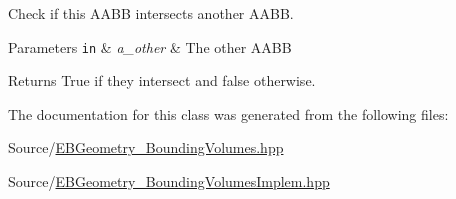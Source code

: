 Check if this A\+A\+BB intersects another A\+A\+BB. 


\begin{DoxyParams}[1]{Parameters}
\mbox{\tt in}  & {\em a\+\_\+other} & The other A\+A\+BB \\
\hline
\end{DoxyParams}
\begin{DoxyReturn}{Returns}
True if they intersect and false otherwise. 
\end{DoxyReturn}


The documentation for this class was generated from the following files\+:\begin{DoxyCompactItemize}
\item 
Source/\hyperlink{EBGeometry__BoundingVolumes_8hpp}{E\+B\+Geometry\+\_\+\+Bounding\+Volumes.\+hpp}\item 
Source/\hyperlink{EBGeometry__BoundingVolumesImplem_8hpp}{E\+B\+Geometry\+\_\+\+Bounding\+Volumes\+Implem.\+hpp}\end{DoxyCompactItemize}
